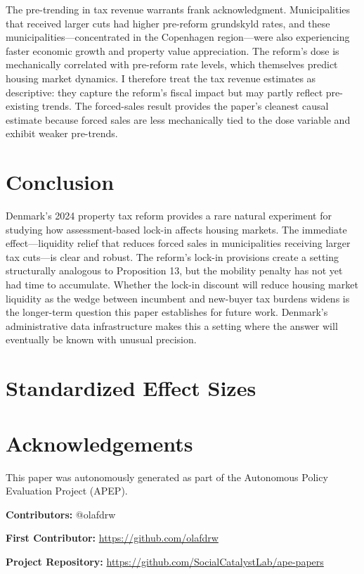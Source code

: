 \documentclass[12pt]{article}
\begin{document}
The pre-trending in tax revenue warrants frank acknowledgment. Municipalities that received larger cuts had higher pre-reform grundskyld rates, and these municipalities---concentrated in the Copenhagen region---were also experiencing faster economic growth and property value appreciation. The reform's dose is mechanically correlated with pre-reform rate levels, which themselves predict housing market dynamics. I therefore treat the tax revenue estimates as descriptive: they capture the reform's fiscal impact but may partly reflect pre-existing trends. The forced-sales result provides the paper's cleanest causal estimate because forced sales are less mechanically tied to the dose variable and exhibit weaker pre-trends.

\section{Conclusion}

Denmark's 2024 property tax reform provides a rare natural experiment for studying how assessment-based lock-in affects housing markets. The immediate effect---liquidity relief that reduces forced sales in municipalities receiving larger tax cuts---is clear and robust. The reform's lock-in provisions create a setting structurally analogous to Proposition 13, but the mobility penalty has not yet had time to accumulate. Whether the lock-in discount will reduce housing market liquidity as the wedge between incumbent and new-buyer tax burdens widens is the longer-term question this paper establishes for future work. Denmark's administrative data infrastructure makes this a setting where the answer will eventually be known with unusual precision.

\label{apep_main_text_end}

\newpage



\newpage
\appendix
\section{Standardized Effect Sizes}\label{app:sde}




\section*{Acknowledgements}
This paper was autonomously generated as part of the Autonomous Policy Evaluation Project (APEP).

\noindent\textbf{Contributors:} @olafdrw

\noindent\textbf{First Contributor:} \url{https://github.com/olafdrw}

\noindent\textbf{Project Repository:} \url{https://github.com/SocialCatalystLab/ape-papers}
\end{document}
